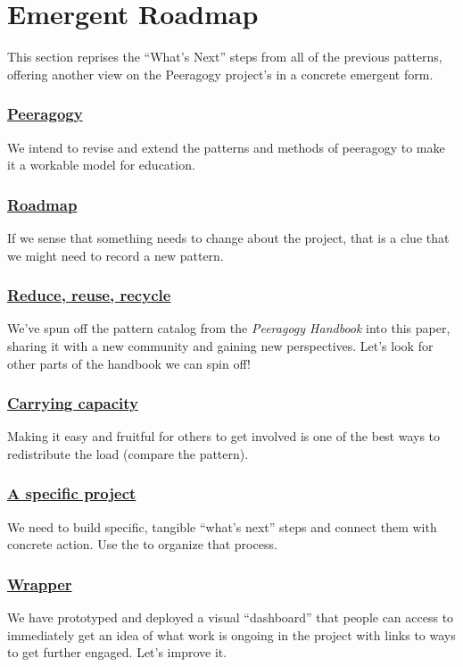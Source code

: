 \section{Emergent Roadmap} \label{sec:Distributed_Roadmap}

This section reprises the ``What's Next'' steps from all of the previous
patterns, offering another view on the Peeragogy project's
 in a concrete emergent form.

\subsubsection*{\hyperref[sec:Peeragogy]{Peeragogy}} 
 We intend to revise and extend the patterns and methods of peeragogy to make it a workable model for education.

\subsubsection*{\hyperref[sec:Roadmap]{Roadmap}} If we sense that something needs to change about the project, that is a clue that we might need to record a new pattern.

\subsubsection*{\hyperref[sec:Use_or_make]{Reduce, reuse, recycle}}
We've spun off the pattern catalog from the \emph{Peeragogy Handbook} into this paper, sharing it with a new community and gaining new perspectives.  Let's look for other parts of the handbook we can spin off!

\subsubsection*{\hyperref[sec:Carrying_capacity]{Carrying capacity}} 
Making it easy and fruitful for others to get involved is one of the best ways to
redistribute the load (compare the
pattern).

\subsubsection*{\hyperref[sec:A_specific_project]{A specific project}}
We need to build specific, tangible ``what's next'' steps and connect them with concrete action. Use the  to organize that process. 

\subsubsection*{\hyperref[sec:Wrapper]{Wrapper}}
We have prototyped and deployed a visual ``dashboard'' that people can access to immediately get an idea of what work is ongoing in the project with links to ways to get further engaged.  Let's improve it.

